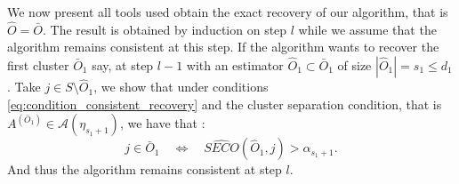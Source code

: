 \documentclass[11pt]{article}
\begin{document}
	We now present all tools used obtain the exact recovery of our algorithm, that is $\hat{O} = \bar{O}$. The result is obtained by induction on step $l$ while we assume that the algorithm remains consistent at this step. If the algorithm wants to recover the first cluster $\bar{O}_1$ say, at step $l-1$ with an estimator $\hat{O}_1 \subset \bar{O}_1$ of size $|\hat{O}_1| = s_1 \leq d_1$. Take $j \in S \setminus \hat{O}_1$, we show that under conditions \eqref{eq:condition_consistent_recovery} and the cluster separation condition, that is $A^{(\bar{O}_1)} \in \mathcal{A}(\eta_{s_1+1})$, we have that :
	\begin{equation*}
		j \in \bar{O}_1 \quad \Longleftrightarrow \quad \widehat{SECO}(\hat{O}_1, j) > \alpha_{s_1+1}.
	\end{equation*}
	And thus the algorithm remains consistent at step $l$.
	
\end{document}

